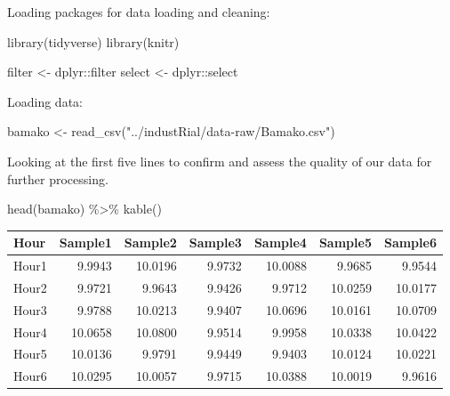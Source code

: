 \documentclass[
]{book}
\newenvironment{Shaded}{\begin{snugshade}}{\end{snugshade}}
\newcommand{\FunctionTok}[1]{\textcolor[rgb]{0.00,0.00,0.00}{#1}}
\newcommand{\NormalTok}[1]{#1}
\newcommand{\OtherTok}[1]{\textcolor[rgb]{0.56,0.35,0.01}{#1}}
\newcommand{\SpecialCharTok}[1]{\textcolor[rgb]{0.00,0.00,0.00}{#1}}
\newcommand{\StringTok}[1]{\textcolor[rgb]{0.31,0.60,0.02}{#1}}
\begin{document}
Loading packages for data loading and cleaning:

\begin{Shaded}
\begin{Highlighting}[]
\FunctionTok{library}\NormalTok{(tidyverse)}
\FunctionTok{library}\NormalTok{(knitr)}

\NormalTok{filter }\OtherTok{\textless{}{-}}\NormalTok{ dplyr}\SpecialCharTok{::}\NormalTok{filter}
\NormalTok{select }\OtherTok{\textless{}{-}}\NormalTok{ dplyr}\SpecialCharTok{::}\NormalTok{select}
\end{Highlighting}
\end{Shaded}

Loading data:

\begin{Shaded}
\begin{Highlighting}[]
\NormalTok{bamako }\OtherTok{\textless{}{-}} \FunctionTok{read\_csv}\NormalTok{(}\StringTok{"../industRial/data{-}raw/Bamako.csv"}\NormalTok{)}
\end{Highlighting}
\end{Shaded}

Looking at the first five lines to confirm and assess the quality of our data for further processing.

\begin{Shaded}
\begin{Highlighting}[]
\FunctionTok{head}\NormalTok{(bamako) }\SpecialCharTok{\%\textgreater{}\%}
    \FunctionTok{kable}\NormalTok{()}
\end{Highlighting}
\end{Shaded}

\begin{tabular}{l|r|r|r|r|r|r}
\hline
Hour & Sample1 & Sample2 & Sample3 & Sample4 & Sample5 & Sample6\\
\hline
Hour1 & 9.9943 & 10.0196 & 9.9732 & 10.0088 & 9.9685 & 9.9544\\
\hline
Hour2 & 9.9721 & 9.9643 & 9.9426 & 9.9712 & 10.0259 & 10.0177\\
\hline
Hour3 & 9.9788 & 10.0213 & 9.9407 & 10.0696 & 10.0161 & 10.0709\\
\hline
Hour4 & 10.0658 & 10.0800 & 9.9514 & 9.9958 & 10.0338 & 10.0422\\
\hline
Hour5 & 10.0136 & 9.9791 & 9.9449 & 9.9403 & 10.0124 & 10.0221\\
\hline
Hour6 & 10.0295 & 10.0057 & 9.9715 & 10.0388 & 10.0019 & 9.9616\\
\hline
\end{tabular}
\end{document}
